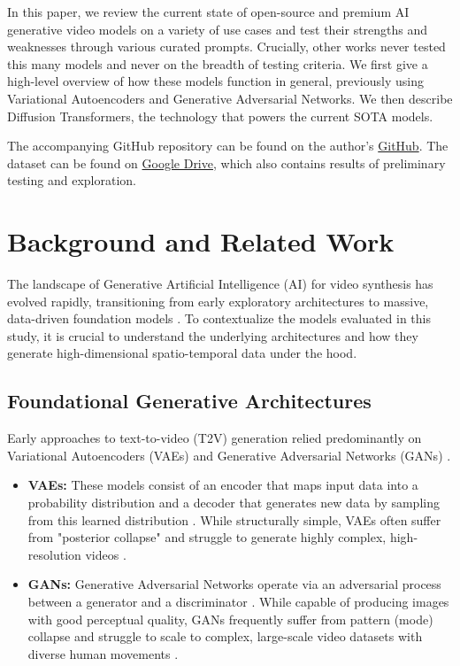 \documentclass[sigconf]{acmart}
\begin{document}
In this paper, we review the current state of open-source and premium AI generative video models on a variety of use cases and test their strengths and weaknesses through various curated prompts. Crucially, other works never tested this many models and never on the breadth of testing criteria. We first give a high-level overview of how these models function in general, previously using Variational Autoencoders and Generative Adversarial Networks. We then describe Diffusion Transformers, the technology that powers the current SOTA models.

The accompanying GitHub repository can be found on the author's \href{https://www.github.com/T-Cent/Character-Consistency}{GitHub}. The dataset can be found on \href{https://drive.google.com/drive/folders/1cEVKn6BVKXk5Svhe4l1FFPjY2MZcX6lc?usp=sharing}{Google Drive}, which also contains results of preliminary testing and exploration.

\section{Background and Related Work}
\label{sec:background}

The landscape of Generative Artificial Intelligence (AI) for video synthesis has evolved rapidly, transitioning from early exploratory architectures to massive, data-driven foundation models \cite{kaswan2023generative, xie2025comprehensive}. To contextualize the models evaluated in this study, it is crucial to understand the underlying architectures and how they generate high-dimensional spatio-temporal data under the hood.

\subsection{Foundational Generative Architectures}
Early approaches to text-to-video (T2V) generation relied predominantly on Variational Autoencoders (VAEs) and Generative Adversarial Networks (GANs) \cite{kaswan2023generative, xie2025comprehensive}.
\begin{itemize}
    \item \textbf{VAEs:} These models consist of an encoder that maps input data into a probability distribution and a decoder that generates new data by sampling from this learned distribution \cite{xie2025comprehensive}. While structurally simple, VAEs often suffer from "posterior collapse" and struggle to generate highly complex, high-resolution videos \cite{xie2025comprehensive}.
    \item \textbf{GANs:} Generative Adversarial Networks operate via an adversarial process between a generator and a discriminator \cite{xie2025comprehensive}. While capable of producing images with good perceptual quality, GANs frequently suffer from pattern (mode) collapse and struggle to scale to complex, large-scale video datasets with diverse human movements \cite{xie2025comprehensive}.
\end{itemize}
\end{document}
